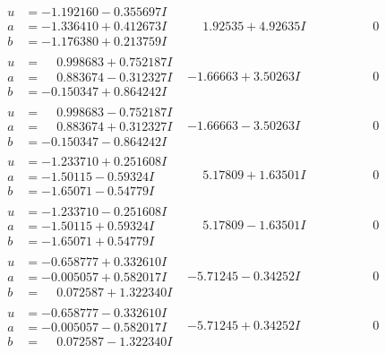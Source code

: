 \documentclass[1p]{elsarticle_modified}
\theoremstyle{definition}
\begin{document}
$$\begin{array}{c|c|c}
\begin{aligned}
u &= -1.192160 - 0.355697 I \\
a &= -1.336410 + 0.412673 I \\
b &= -1.176380 + 0.213759 I\end{aligned}
 & \phantom{-}1.92535 + 4.92635 I & \phantom{-0.000000 } 0 \\ \hline\begin{aligned}
u &= \phantom{-}0.998683 + 0.752187 I \\
a &= \phantom{-}0.883674 - 0.312327 I \\
b &= -0.150347 + 0.864242 I\end{aligned}
 & -1.66663 + 3.50263 I & \phantom{-0.000000 } 0 \\ \hline\begin{aligned}
u &= \phantom{-}0.998683 - 0.752187 I \\
a &= \phantom{-}0.883674 + 0.312327 I \\
b &= -0.150347 - 0.864242 I\end{aligned}
 & -1.66663 - 3.50263 I & \phantom{-0.000000 } 0 \\ \hline\begin{aligned}
u &= -1.233710 + 0.251608 I \\
a &= -1.50115 - 0.59324 I \\
b &= -1.65071 - 0.54779 I\end{aligned}
 & \phantom{-}5.17809 + 1.63501 I & \phantom{-0.000000 } 0 \\ \hline\begin{aligned}
u &= -1.233710 - 0.251608 I \\
a &= -1.50115 + 0.59324 I \\
b &= -1.65071 + 0.54779 I\end{aligned}
 & \phantom{-}5.17809 - 1.63501 I & \phantom{-0.000000 } 0 \\ \hline\begin{aligned}
u &= -0.658777 + 0.332610 I \\
a &= -0.005057 + 0.582017 I \\
b &= \phantom{-}0.072587 + 1.322340 I\end{aligned}
 & -5.71245 - 0.34252 I & \phantom{-0.000000 } 0 \\ \hline\begin{aligned}
u &= -0.658777 - 0.332610 I \\
a &= -0.005057 - 0.582017 I \\
b &= \phantom{-}0.072587 - 1.322340 I\end{aligned}
 & -5.71245 + 0.34252 I & \phantom{-0.000000 } 0\\

\end{array}$$
\end{document}
